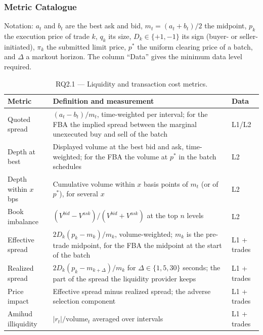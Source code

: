 \documentclass[11pt]{article}
\begin{document}

\subsubsection{Metric Catalogue}
\label{sec:metrics}

Notation: $a_t$ and $b_t$ are the best ask and bid, $m_t = (a_t+b_t)/2$ the midpoint, $p_k$ the execution price of trade $k$, $q_k$ its size, $D_k \in \{+1,-1\}$ its sign (buyer- or seller-initiated), $\pi_k$ the submitted limit price, $p^{*}$ the uniform clearing price of a batch, and $\Delta$ a markout horizon. The column ``Data'' gives the minimum data level required.

\begin{table}[htbp]
\centering
\small
\caption{RQ2.1 --- Liquidity and transaction cost metrics.}
\label{tab:liquidity}
\begin{tabularx}{\textwidth}{@{}p{3.3cm} L p{1.1cm}@{}}
\hline
\textbf{Metric} & \textbf{Definition and measurement} & \textbf{Data} \\
\hline
Quoted spread & $(a_t-b_t)/m_t$, time-weighted per interval; for the FBA the implied spread between the marginal unexecuted buy and sell of the batch & L1/L2 \\
Depth at best & Displayed volume at the best bid and ask, time-weighted; for the FBA the volume at $p^{*}$ in the batch schedules & L2 \\
Depth within $x$ bps & Cumulative volume within $x$ basis points of $m_t$ (or of $p^{*}$), for several $x$ & L2 \\
Book imbalance & $(V^{bid}-V^{ask})/(V^{bid}+V^{ask})$ at the top $n$ levels & L2 \\
Effective spread & $2D_k(p_k-m_k)/m_k$, volume-weighted; $m_k$ is the pre-trade midpoint, for the FBA the midpoint at the start of the batch & L1 + trades \\
Realized spread & $2D_k(p_k-m_{k+\Delta})/m_k$ for $\Delta \in \{1,5,30\}$ seconds; the part of the spread the liquidity provider keeps & L1 + trades \\
Price impact & Effective spread minus realized spread; the adverse selection component & L1 + trades \\
Amihud illiquidity & $|r_t|/\text{volume}_t$ averaged over intervals & L1 + trades \\
\hline
\end{tabularx}
\end{table}
\end{document}
